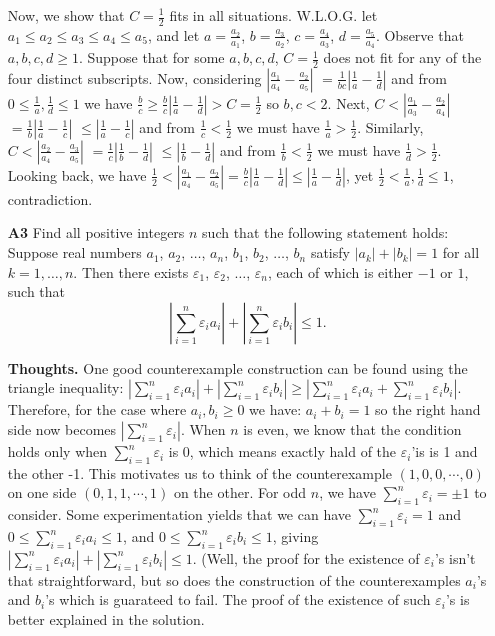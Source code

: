 \documentclass[11pt,a4paper]{article}
\begin{document}
\begin{itemize}
Now, we show that $C=\frac 12$ fits in all situations. 
W.L.O.G. let $a_1\le a_2\le a_3\le a_4\le a_5$, and let $a=\frac {a_2}{a_1}$, 
$b=\frac {a_3}{a_2}$, 
$c=\frac {a_4}{a_3}$, 
$d=\frac {a_5}{a_4}$. 
Observe that $a, b, c, d\ge 1$. 
Suppose that for some $a,b,c,d$, $C=\frac 12$ does not fit for any of the four distinct subscripts. 
Now, considering $|\frac {a_1}{a_4}-\frac {a_2}{a_5}|$
$=\frac 1{bc}|\frac 1a-\frac 1d|$
and from $0\le \frac 1a, \frac 1d\le 1$
we have $\frac bc\ge \frac bc|\frac 1a-\frac 1d|>C=\frac 12$
so $b, c<2$. 
Next, $C<|\frac {a_1}{a_3}-\frac {a_2}{a_4}|$
$=\frac 1b|\frac 1a-\frac 1c|$
$\le |\frac 1a-\frac 1c|$
and from $\frac 1c<\frac 12$ we must have $\frac 1a>\frac 12$. 
Similarly, $C<|\frac {a_2}{a_4}-\frac {a_3}{a_5}|$
$=\frac 1c|\frac 1b-\frac 1d|$
$\le |\frac 1b-\frac 1d|$
and from $\frac 1b<\frac 12$ we must have $\frac 1d>\frac 12$. 
Looking back, we have $\frac 12<|\frac {a_1}{a_4}-\frac {a_2}{a_5}|=\frac bc|\frac 1a-\frac 1d|\le|\frac 1a-\frac 1d|$, 
yet $\frac 12<\frac 1a , \frac 1d\le 1$, contradiction.

\item[\textbf{A3}]
Find all positive integers $n$ such that the following statement holds: Suppose real numbers $a_1$, $a_2$, $\dots$, $a_n$, $b_1$, $b_2$, $\dots$, $b_n$ satisfy $|a_k|+|b_k|=1$ for all $k=1,\dots,n$. Then there exists $\varepsilon_1$, $\varepsilon_2$, $\dots$, $\varepsilon_n$, each of which is either $-1$ or $1$, such that
\[ \left| \sum_{i=1}^n \varepsilon_i a_i \right| + \left| \sum_{i=1}^n \varepsilon_i b_i \right| \le 1. \]

\textbf{Thoughts.} 
One good counterexample construction can be found using the triangle inequality: 
$ \left| \sum_{i=1}^n \varepsilon_i a_i \right| + \left| \sum_{i=1}^n \varepsilon_i b_i \right|\ge  \left| \sum_{i=1}^n \varepsilon_i a_i + \sum_{i=1}^n \varepsilon_i b_i \right|$. 
Therefore, for the case where $a_i, b_i\ge 0$ we have: 
$a_i+b_i=1$ 
so the right hand side now becomes $\left| \sum_{i=1}^n \varepsilon_i \right|$. 
When $n$ is even, we know that the condition holds only when $\sum_{i=1}^n \varepsilon_i$ is 0, which means exactly hald of the $\varepsilon_i$'is is 1 and the other -1. 
This motivates us to think of the counterexample $(1, 0, 0, \cdots , 0)$ on one side $(0, 1, 1, \cdots, 1)$ on the other. 
For odd $n$, we have $\sum_{i=1}^n \varepsilon_i=\pm 1$ to consider. 
Some experimentation yields that we can have $\sum_{i=1}^n \varepsilon_i= 1$ and 
$0\le \sum_{i=1}^n \varepsilon_i a_i\le 1$, and 
$0\le \sum_{i=1}^n \varepsilon_i b_i\le 1$, giving 
$| \sum_{i=1}^n \varepsilon_i a_i|+|\sum_{i=1}^n \varepsilon_i b_i|\le 1$. 
(Well, the proof for the existence of $\varepsilon_i$'s isn't that straightforward, but so does the construction of the counterexamples $a_i$'s and $b_i$'s which is guarateed to fail. The proof of the existence of such $\varepsilon_i$'s is better explained in the solution. 


\end{itemize}
\end{document}
